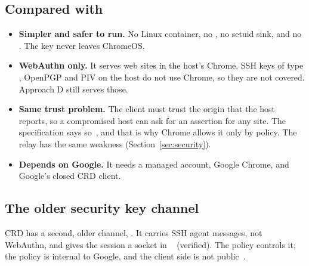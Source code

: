 \subsection{Compared with }

\begin{itemize}
\item \textbf{Simpler and safer to run.} No Linux container, no
      , no setuid sink, and no . The key never leaves
      ChromeOS.
\item \textbf{WebAuthn only.} It serves web sites in the host's Chrome.
      SSH keys of type , OpenPGP and PIV on the host do not use
      Chrome, so they are not covered. Approach D still serves those.
\item \textbf{Same trust problem.} The client must trust the origin that the
      host reports, so a compromised host can ask for an assertion for any
      site. The specification says so~\cite{webauthn-ed}, and that is why
      Chrome allows it only by policy. The relay has the same weakness
      (Section~\ref{sec:security}).
\item \textbf{Depends on Google.} It needs a managed account, Google Chrome,
      and Google's closed CRD client.
\end{itemize}

\subsection{The older security key channel}

CRD has a second, older channel, . It carries SSH agent
messages, not WebAuthn, and gives the session a socket in
~\cite{crdgnubby} (verified). The policy
 controls it; the policy is
internal to Google, and the client side is not public~\cite{crdpol}.
